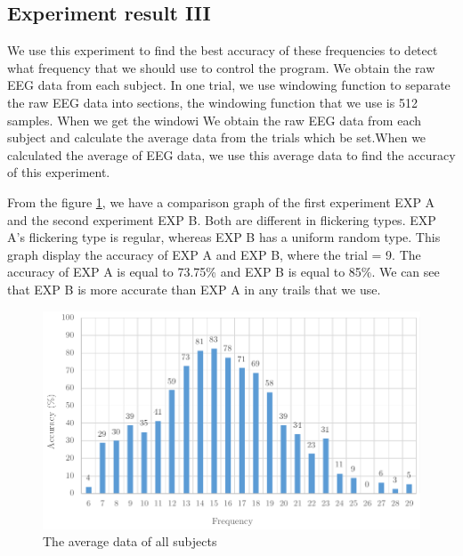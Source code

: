 \newpage
\subsection{Experiment result III}
\hspace{1.5cm} We use this experiment to find the best accuracy of these frequencies to detect what frequency that we should use to control the program. We obtain the raw EEG data from each subject. In one trial, we use windowing function to separate the raw EEG data into sections, the windowing function that we use is 512 samples. When we get the windowi
We obtain the raw EEG data from each subject and calculate the average data from the trials which be set.When we calculated the average of EEG data, we use this average data to find the accuracy of this experiment.

From the figure \ref{fig:avg_exp3}, we have a comparison graph of the first experiment EXP A and the second experiment EXP B. Both are different in flickering types. EXP A's flickering type is regular, whereas EXP B has a uniform random type. This graph display the accuracy of EXP A and EXP B, where the trial = 9. The accuracy of EXP A is equal to 73.75\% and EXP B is equal to 85\%. We can see that EXP B is more accurate than EXP A in any trails that we use.

\begin{figure}[ht]
	\centering
	\includegraphics[scale = 1]{chapter7/exp4.pdf}
	\caption{The average data of all subjects}
    \label{fig:avg_exp3}
\end{figure}


